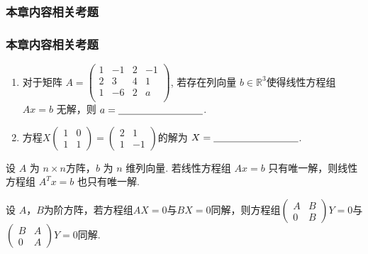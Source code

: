 \subsubsection{本章内容相关考题}
\begin{frame}\frametitle{本章内容相关考题}

\begin{problem}[2024春期中，填空(5'/题)]
\begin{enumerate}
\item 对于矩阵 $A = \begin{pmatrix}
1 &-1&2&-1\\2&3&4&1\\1&-6&2&a\\
\end{pmatrix}$, 若存在列向量 $b\in \mathbb R^3$使得线性方程组 $Ax=b$ 无解，则 $a=\underline{\makebox[3cm]{}}$.
\item 方程$X\begin{pmatrix}1&0\\1&1\end{pmatrix} = \begin{pmatrix}2&1\\1&-1\end{pmatrix}$的解为 $X=\underline{\makebox[3cm]{}}$.
\end{enumerate}
\end{problem}



\begin{problem}
设 $A$ 为 $n\times n$方阵，$b$ 为 $n$ 维列向量. 若线性方程组 $Ax=b$ 只有唯一解，则线性方程组 $A^Tx = b$ 也只有唯一解.
\end{problem}

\begin{problem}
设 $A，B$为阶方阵，若方程组$AX=0$与$BX=0$同解，则方程组$\begin{pmatrix}A&B\\0&B\end{pmatrix}Y=0$与$\begin{pmatrix}B&A\\0&A\end{pmatrix}Y=0$同解.
\end{problem}
\end{frame}




